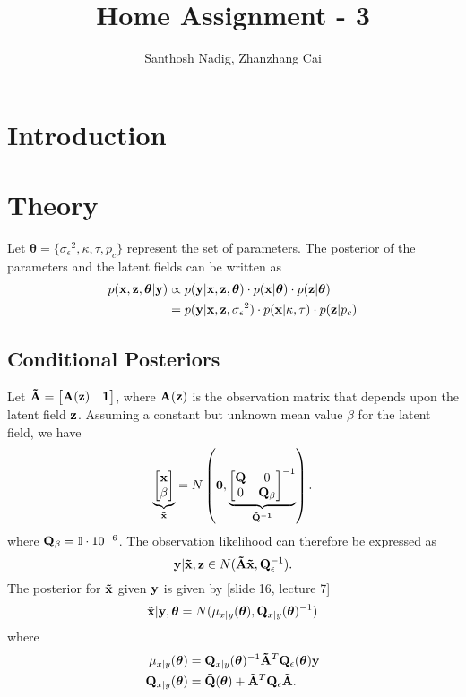 \documentclass[a4paper,10pt]{article}
\title{Home Assignment - 3}
\author{Santhosh Nadig, Zhanzhang Cai}
\def\bA{{\bf A}}
\def\bQ{{\bf Q}}
\def\btQ{{\bf \tilde Q}}
\def\btA{{\bf \tilde A}}
\def\bx{{\bf x}}
\def\by{{\bf y}}
\def\bz{{\bf z}}
\def\btx{{\bf{\tilde x}}}
\def\btheta{{\boldsymbol \theta}}
\def\sigmaeps{{\sigma_{\epsilon}}}
\begin{document}
\maketitle

\section{Introduction}

\section{Theory}
Let $\btheta = \{ \sigmaeps^2, \kappa, \tau, p_c\}$ represent the set of parameters. The posterior of the parameters and the latent fields can be written as
\begin{align}
 p(\bx, \bz, \btheta | \by) &\propto p(\by | \bx, \bz, \btheta) \cdot p(\bx|\btheta) \cdot p(\bz|\btheta) \nonumber \\
 &= p(\by | \bx, \bz, \sigmaeps^2) \cdot p(\bx|\kappa, \tau) \cdot p(\bz|p_c)
\end{align}

\subsection{Conditional Posteriors}

Let $\btA = \begin{bmatrix} \bA(\bz) & \bf{1}\end{bmatrix}$, where  $\bA(\bz)$ is the observation matrix that depends upon the latent field $\bz$. Assuming a constant but unknown mean value $\beta$ for the latent field, we have
\begin{equation}
 \underbrace{\begin{bmatrix}
              \bx \\
              \beta
             \end{bmatrix}
}_{\btx} = N\left( \bf{0}, \underbrace{\begin{bmatrix}
                                  \bQ & 0 \\
                                  0 & \bQ_{\beta}
                                 \end{bmatrix}^{-1}}_{\btQ^{-1}} \right).
\end{equation}
where $\bQ_{\beta} =  \mathbb{I}\cdot 10^{-6}$. The observation likelihood can therefore be expressed as
\begin{equation}
 \by|\btx, \bz \in N(\btA\btx, \bQ_{\epsilon}^{-1}).
\end{equation}
The posterior for $\btx$ given $\by$ is given by [slide 16, lecture 7]
\begin{equation}
 \btx|\by, \btheta = N(\mu_{x|y} (\btheta), \bQ_{x|y}(\btheta)^{-1}) 
\end{equation}
where
\begin{align}
 \mu_{x|y} (\btheta) &=  \bQ_{x|y}(\btheta)^{-1} \btA^T \bQ_{\epsilon} (\btheta) \by \nonumber \\
 \bQ_{x|y}(\btheta) &= \btQ(\btheta) + \btA^T \bQ_{\epsilon}\btA.
\end{align}
\end{document}

